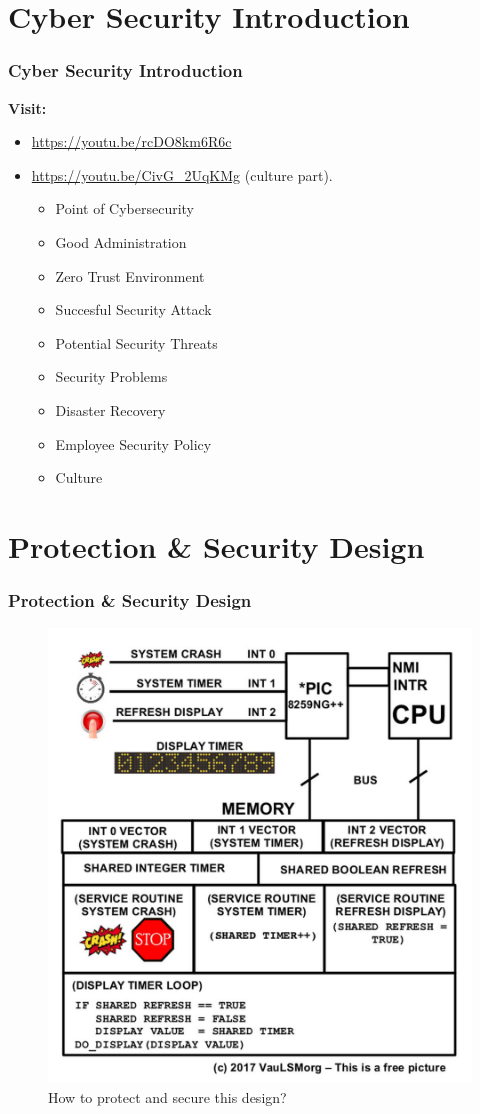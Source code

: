 \documentclass[aspectratio=169, xcolor=table, notheorems, hyperref={pdfpagelabels=false}]{beamer}
\begin{document}
\section{Cyber Security Introduction}
\begin{frame}[fragile]
\frametitle{Cyber Security Introduction}

\textbf{Visit:}
\begin{itemize}
\item \url{https://youtu.be/rcDO8km6R6c}
\item \url{https://youtu.be/CivG_2UqKMg} (culture part).
\begin{itemize}
\item Point of Cybersecurity
\item Good Administration
\item Zero Trust Environment
\item Succesful Security Attack
\item Potential Security Threats
\item Security Problems
\item Disaster Recovery
\item Employee Security Policy
\item Culture
\end{itemize}
\end{itemize}
\end{frame}

\section{Protection \& Security Design}
\begin{frame}[fragile]
\frametitle{Protection \& Security Design}

\begin{figure}
\includegraphics[width=0.40\linewidth]{os00-int-protection}
\caption{How to protect and secure this design?}
\end{figure}

\end{frame}
\end{document}
